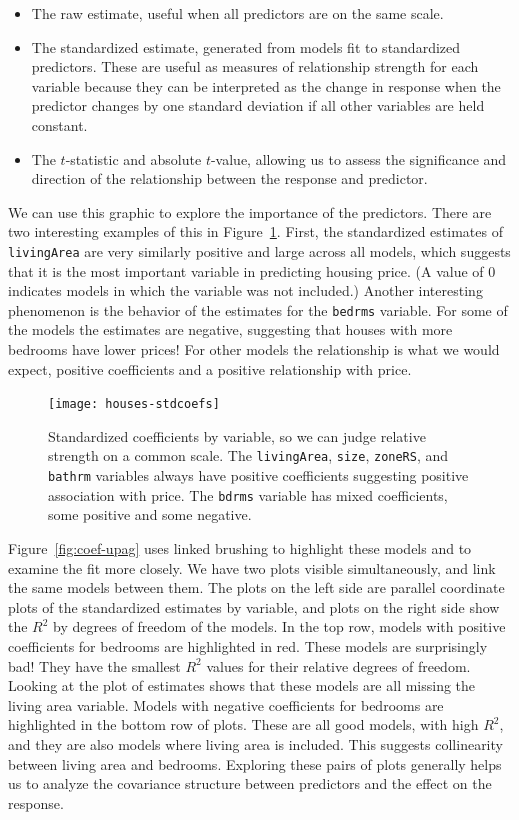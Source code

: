 \documentclass[preprint]{imsart}
\begin{document}
\begin{itemize} \itemsep 0in
	\item The raw estimate, useful when all predictors are on the same scale.

	\item The standardized estimate, generated from models fit to standardized predictors. These are useful as measures of relationship strength for each variable because they can be interpreted as the change in response when the predictor changes by one standard deviation if all other variables are held constant.

	\item The $t$-statistic and absolute $t$-value, allowing us to assess the significance and direction of the relationship between the response and predictor.
\end{itemize}

We can use this graphic to explore the importance of the predictors. There are two interesting examples of this in Figure~\ref{fig:coef}. First, the standardized estimates of {\tt livingArea} are very similarly positive and large across all models, which suggests that it is the most important variable in predicting housing price. (A value of 0 indicates models in which the variable was not included.) Another interesting phenomenon is the behavior of the estimates for the {\tt bedrms} variable. For some of the models the estimates are negative, suggesting that houses with more bedrooms have lower prices! For other models the relationship is what we would expect, positive coefficients and a positive relationship with price.

\begin{figure}[htbp]
	\centering
	\texttt{[image: houses-stdcoefs]}
	\caption{Standardized coefficients by variable, so we can judge relative strength on a common scale. The {\tt livingArea}, {\tt size}, {\tt zoneRS}, and {\tt bathrm} variables always have positive coefficients suggesting positive association with price. The {\tt bdrms} variable has mixed coefficients, some positive and some negative.}
	\label{fig:coef}
\end{figure}

Figure~\ref{fig:coef-upag} uses linked brushing to highlight these models and to examine the fit more closely. We have two plots visible simultaneously, and link the same models between them. The plots on the left side are parallel coordinate plots of the standardized estimates by variable, and plots on the right side show the $R^2$ by degrees of freedom of the models. In the top row, models with positive coefficients for bedrooms are highlighted in red. These models are surprisingly bad! They have the smallest $R^2$ values for their relative degrees of freedom. Looking at the plot of estimates shows that these models are all missing the living area variable. Models with negative coefficients for bedrooms are highlighted in the bottom row of plots. These are all good models, with high $R^2$, and they are also models where living area is included. This suggests collinearity between living area and bedrooms. Exploring these pairs of plots generally helps us to analyze the covariance structure between predictors and the effect on the response.
\end{document}
